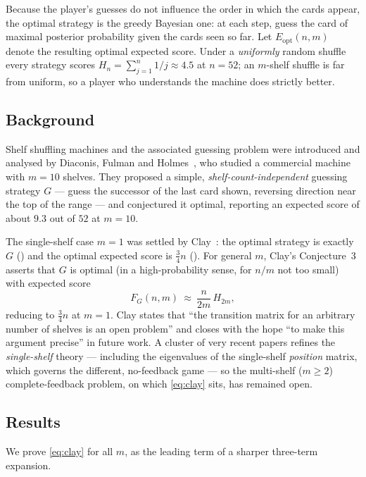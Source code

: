 \documentclass[11pt]{article}
\theoremstyle{definition}
\newcommand{\eopt}{E_{\mathrm{opt}}}
\begin{document}
Because the player's guesses do not influence the order in which the cards appear, the optimal
strategy is the greedy Bayesian one: at each step, guess the card of maximal posterior
probability given the cards seen so far. Let $\eopt(n,m)$ denote the resulting optimal expected
score. Under a \emph{uniformly} random shuffle every strategy scores $H_n=\sum_{j=1}^n 1/j
\approx 4.5$ at $n=52$; an $m$-shelf shuffle is far from uniform, so a player who understands
the machine does strictly better.

\subsection*{Background}
Shelf shuffling machines and the associated guessing problem were introduced and analysed by
Diaconis, Fulman and Holmes~\cite{DFH}, who studied a commercial machine with $m=10$ shelves.
They proposed a simple, \emph{shelf-count-independent} guessing strategy $G$ --- guess the
successor of the last card shown, reversing direction near the top of the range --- and
conjectured it optimal, reporting an expected score of about $9.3$ out of $52$ at $m=10$.

The single-shelf case $m=1$ was settled by Clay~\cite{Clay}: the optimal strategy is exactly
$G$ (\cite[Thm.~1.4]{Clay}) and the optimal expected score is $\tfrac34 n$
(\cite[Thm.~1.5]{Clay}). For general $m$, Clay's Conjecture~3 asserts that $G$ is optimal (in a
high-probability sense, for $n/m$ not too small) with expected score
\begin{equation}\label{eq:clay}
  F_G(n,m)\ \approx\ \frac{n}{2m}\,H_{2m},
\end{equation}
reducing to $\tfrac34 n$ at $m=1$. Clay states that ``the transition matrix for an arbitrary
number of shelves is an open problem'' and closes with the hope ``to make this argument
precise'' in future work. A cluster of very recent papers \cite{Tripathi,Kuba,CKT} refines the
\emph{single-shelf} theory --- including the eigenvalues of the single-shelf \emph{position}
matrix, which governs the different, no-feedback game --- so the multi-shelf ($m\ge2$)
complete-feedback problem, on which \eqref{eq:clay} sits, has remained open.

\subsection*{Results}
We prove \eqref{eq:clay} for all $m$, as the leading term of a sharper three-term expansion.
\end{document}
